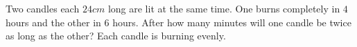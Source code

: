 Two candles each $24cm$ long are lit at the same time. One burns completely in $4$ hours and the other in $6$ hours. After how many minutes will one candle be twice as long as the other? Each candle is burning evenly.
